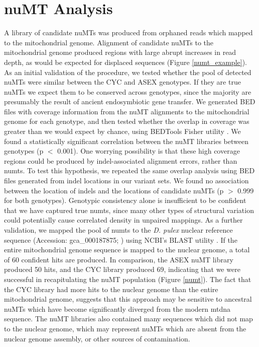 \documentclass[12pt,twoside]{reedthesis}
\begin{document}
\section{nuMT Analysis}
A library of candidate nuMTs was produced from orphaned reads which mapped to the mitochondrial genome. 
Alignment of candidate nuMTs to the mitochondrial genome produced regions with large abrupt increases in read depth, as would be expected for displaced sequences (Figure \ref{numt_example}).
As an initial validation of the procedure, we tested whether the pool of detected nuMTs were similar between the \gls{CYC} and \gls{ASEX} genotypes.
If they are true nuMTs we expect them to be conserved across genotypes, since the majority are presumably the result of ancient endosymbiotic gene transfer.
We generated BED files with coverage information from the nuMT alignments to the mitochondrial genome for each genotype, and then tested whether the overlap in coverage was greater than we would expect by chance, using BEDTools Fisher utility \citep{quinlan_bedtools:_2010}.
We found a statistically significant correlation between the nuMT libraries between genotypes (p $<$ 0.001).
One worrying possibility is that these high coverage regions could be produced by indel-associated alignment errors, rather than \gls{numts}.
To test this hypothesis, we repeated the same overlap analysis using BED files generated from indel locations in our variant sets. 
We found no association between the location of \gls{indels} and the locations of candidate nuMTs (p $>$ 0.999 for both genotypes).
Genotypic consistency alone is insufficient to be confident that we have captured true \gls{numts}, since many other types of structural variation could potentially cause correlated density in unpaired mappings.
As a further validation, we mapped the pool of \gls{numts} to the \textit{D. pulex} nuclear reference sequence (Accession: gca\_000187875; \citealp{colbourne_ecoresponsive_2011}) using NCBI's BLAST utility \citep{altschul_basic_1990}.
If the entire mitochondrial genome sequence is mapped to the nuclear genome, a total of 60 confident hits are produced.
In comparison, the \gls{ASEX} nuMT library produced 50 hits, and the \gls{CYC} library produced 69, indicating that we were successful in recapitulating the nuMT population (Figure \ref{numt}).
The fact that the \gls{CYC} library had more hits to the nuclear genome than the entire mitochondrial genome, suggests that this approach may be sensitive to ancestral nuMTs which have become significantly diverged from the modern \gls{mtdna} sequence.
The nuMT libraries also contained many sequences which did not map to the nuclear genome, which may represent nuMTs which are absent from the nuclear genome assembly, or other sources of contamination. 
\end{document}
